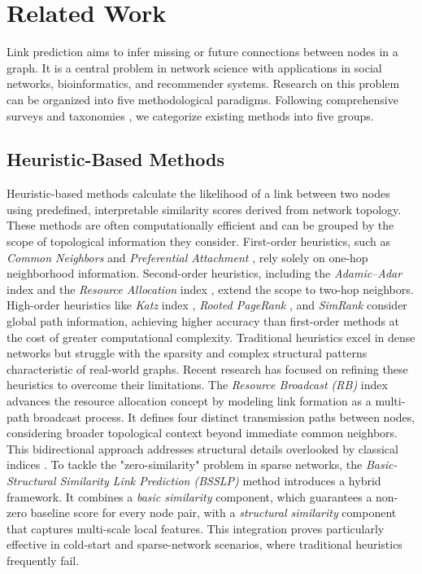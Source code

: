\documentclass[pdflatex,sn-mathphys-num]{sn-jnl}%
\theoremstyle{thmstyleone}%
\theoremstyle{thmstyletwo}%
\theoremstyle{thmstylethree}%
\theoremstyle{plain} %
\theoremstyle{definition} %
\theoremstyle{remark} %
\theoremstyle{plain} %
\begin{document}
\section{Related Work}
\label{sec:related_work}

Link prediction aims to infer missing or future connections between nodes in a graph. 
It is a central problem in network science with applications in social networks, bioinformatics, and recommender systems.
Research on this problem can be organized into five methodological paradigms.
 Following comprehensive surveys and taxonomies \cite{cai2021line,arrar2024comprehensive,ben2025comprehensive}, we categorize existing methods into five groups.


\subsection{Heuristic-Based Methods}
Heuristic-based methods calculate the likelihood of a link between two nodes using predefined, interpretable similarity scores derived from network topology. 
These methods are often computationally efficient and can be grouped by the scope of topological information they consider.
First-order heuristics, such as \textit{Common Neighbors} and \textit{Preferential Attachment} \cite{barabasi1999emergence}, rely solely on one-hop neighborhood information. 
Second-order heuristics, including the \textit{Adamic–Adar} index \cite{adamic2003friends} and the \textit{Resource Allocation} index \cite{23zhou2009predicting}, extend the scope to two-hop neighbors. 
High-order heuristics like \textit{Katz} index \cite{24katz1953new}, \textit{Rooted PageRank} \cite{25brin2012reprint}, and \textit{SimRank} \cite{26jeh2002simrank} consider global path information, achieving higher accuracy than first-order methods at the cost of greater computational complexity. 
Traditional heuristics excel in dense networks but struggle with the sparsity and complex structural patterns characteristic of real-world graphs.
Recent research has focused on refining these heuristics to overcome their limitations. 
The \textit{Resource Broadcast (RB)} index \cite{liu2024rb} advances the resource allocation concept by modeling link formation as a multi-path broadcast process. 
It defines four distinct transmission paths between nodes, considering broader topological context beyond immediate common neighbors. This bidirectional approach addresses structural details overlooked by classical indices \cite{kong2025general}. 
To tackle the "zero-similarity" problem in sparse networks, the \textit{Basic-Structural Similarity Link Prediction (BSSLP)} method \cite{liu2025bsslp} introduces a hybrid framework. 
It combines a \textit{basic similarity} component, which guarantees a non-zero baseline score for every node pair, with a \textit{structural similarity} component that captures multi-scale local features. This integration proves particularly effective in cold-start and sparse-network scenarios, where traditional heuristics frequently fail.
\end{document}
